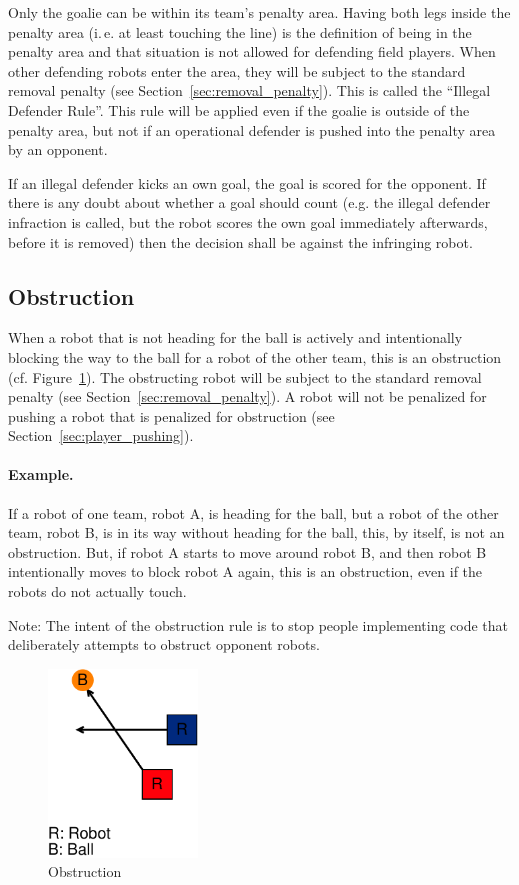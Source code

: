 \documentclass[12pt]{article}
\newcommand{\ie}{\mbox{i.\,e.}\xspace}
\newcommand{\cf}{\mbox{cf.}\xspace}
\begin{document}
Only the goalie can be within its team's penalty area. Having both legs inside the penalty area (\ie at least touching the line) is the definition of being in the penalty area and that situation is not allowed for defending field players. When other defending robots enter the area, they will be subject to the standard removal penalty (see Section~\ref{sec:removal_penalty}). This is called the ``Illegal Defender Rule''. This rule will be applied even if the goalie is outside of the penalty area, but not if an operational defender is pushed into the penalty area by an opponent.

If an illegal defender kicks an own goal, the goal is scored for the opponent. If there is any doubt about whether a goal should count (e.g. the illegal defender infraction is called, but the robot scores the own goal immediately afterwards, before it is removed) then the decision shall be against the infringing robot.

\subsection{Obstruction}

When a robot that is not heading for the ball is actively and intentionally blocking the way to the ball for a robot of the other team, this is an obstruction (\cf Figure~\ref{fig:obstruction}). The obstructing robot will be subject to the standard removal penalty (see Section~\ref{sec:removal_penalty}). A robot will not be penalized for pushing a robot that is penalized for obstruction (see Section~\ref{sec:player_pushing}).

\paragraph{Example.} If a robot of one team, robot A, is heading for the ball, but a robot of the other team, robot B, is in its way without heading for the ball, this, by itself, is not an obstruction. But, if robot A starts to move around robot B, and then robot B intentionally moves to block robot A again, this is an obstruction, even if the robots do not actually touch.

Note: The intent of the obstruction rule is to stop people implementing code that deliberately attempts to obstruct opponent robots.

\begin{figure}[t]
\centerline{\includegraphics[height=5cm]{figs/obstruction}}
\caption{Obstruction}\label{fig:obstruction}
\end{figure}
\end{document}
